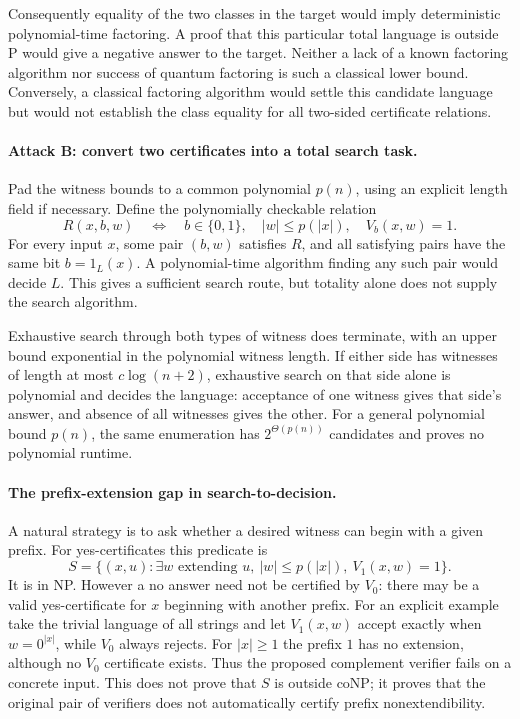 \documentclass[11pt]{article}
\begin{document}
Consequently equality of the two classes in the target would imply
deterministic polynomial-time factoring. A proof that this particular total
language is outside P would give a negative answer to the target. Neither
a lack of a known factoring algorithm nor success of quantum factoring is
such a classical lower bound. Conversely, a classical factoring algorithm
would settle this candidate language but would not establish the class
equality for all two-sided certificate relations.

\paragraph{Attack B: convert two certificates into a total search task.}
Pad the witness bounds to a common polynomial $p(n)$, using an explicit
length field if necessary. Define the polynomially checkable relation
\[
 R(x,b,w)\quad\Longleftrightarrow\quad
      b\in\{0,1\},\quad |w|\le p(|x|),\quad V_b(x,w)=1.
\]
For every input $x$, some pair $(b,w)$ satisfies $R$, and all satisfying
pairs have the same bit $b=1_L(x)$. A polynomial-time algorithm finding any
such pair would decide $L$. This gives a sufficient search route, but
totality alone does not supply the search algorithm.

Exhaustive search through both types of witness does terminate, with an
upper bound exponential in the polynomial witness length. If either side
has witnesses of length at most $c\log(n+2)$, exhaustive search on that
side alone is polynomial and decides the language: acceptance of one
witness gives that side's answer, and absence of all witnesses gives the
other. For a general polynomial bound $p(n)$, the same enumeration has
$2^{\Theta(p(n))}$ candidates and proves no polynomial runtime.

\paragraph{The prefix-extension gap in search-to-decision.}
A natural strategy is to ask whether a desired witness can begin with a
given prefix. For yes-certificates this predicate is
\[
 S=\{(x,u):\exists w\text{ extending }u,\ |w|\le p(|x|),\ V_1(x,w)=1\}.
\]
It is in NP. However a no answer need not be certified by $V_0$: there
may be a valid yes-certificate for $x$ beginning with another prefix.
For an explicit example take the trivial language of all strings and let
$V_1(x,w)$ accept exactly when $w=0^{|x|}$, while $V_0$ always rejects.
For $|x|\ge1$ the prefix $1$ has no extension, although no $V_0$ certificate
exists. Thus the proposed complement verifier fails on a concrete input.
This does not prove that $S$ is outside coNP; it proves that the original
pair of verifiers does not automatically certify prefix nonextendibility.
\end{document}
